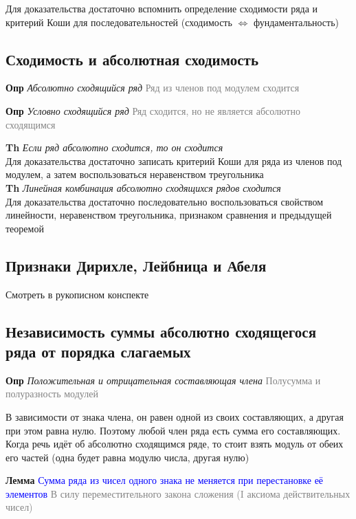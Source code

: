 Для доказательства достаточно вспомнить определение сходимости ряда и критерий Коши для последовательностей (сходимость $\Leftrightarrow$ фундаментальность)

\subsection{Сходимость и абсолютная сходимость}

\textbf{Опр} \textit{Абсолютно сходящийся ряд} \textcolor{gray}{Ряд из членов под модулем сходится}

\textbf{Опр} \textit{Условно сходящийся ряд} \textcolor{gray}{Ряд сходится, но не является абсолютно сходящимся}

\textbf{Th} \textit{Если ряд абсолютно сходится, то он сходится} \\

Для доказательства достаточно записать критерий Коши для ряда из членов под модулем, а затем воспользоваться
неравенством треугольника \\

\textbf{Th} \textit{Линейная комбинация абсолютно сходящихся рядов сходится} \\

Для доказательства достаточно последовательно воспользоваться свойством линейности, неравенством треугольника,
признаком сравнения и предыдущей теоремой

\subsection{Признаки Дирихле, Лейбница и Абеля}

Смотреть в рукописном конспекте

\subsection{Независимость суммы абсолютно сходящегося ряда от порядка слагаемых}

\textbf{Опр} \textit{Положительная и отрицательная составляющая члена} \textcolor{gray}{Полусумма и полуразность
модулей}

В зависимости от знака члена, он равен одной из своих составляющих, а другая при этом равна нулю.
Поэтому любой член ряда есть сумма его составляющих.
Когда речь идёт об абсолютно сходящимся ряде, то стоит взять модуль от обеих его частей (одна будет равна модулю
числа, другая нулю)

\textbf{Лемма} \textcolor{blue}{Сумма ряда из чисел одного знака не меняется при перестановке её элементов} \textcolor{gray}{В
силу переместительного закона сложения (I аксиома действительных чисел)}

